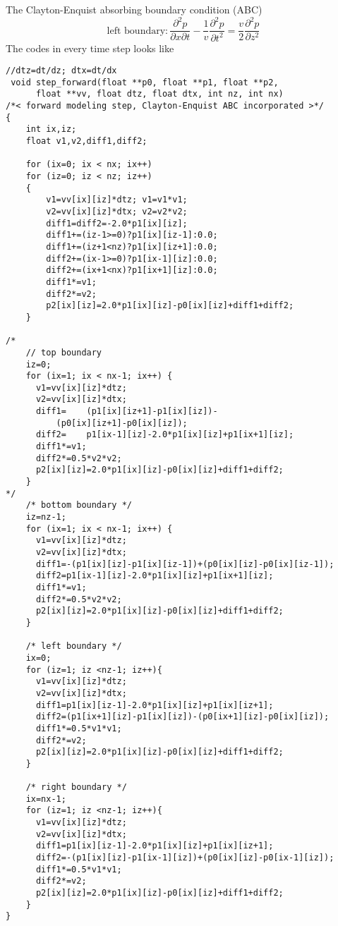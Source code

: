 The Clayton-Enquist absorbing boundary condition (ABC) \citep{Clayton_1977_ABC}
\begin{equation}
 \mbox{left boundary}:\frac{\partial^2 p}{\partial x\partial t}-\frac{1}{v}\frac{\partial^2 p}{\partial t^2}=\frac{v}{2}\frac{\partial^2 p}{\partial z^2}
\end{equation}
The codes in every time step looks like
\begin{lstlisting}
//dtz=dt/dz; dtx=dt/dx
 void step_forward(float **p0, float **p1, float **p2, 
      float **vv, float dtz, float dtx, int nz, int nx)
/*< forward modeling step, Clayton-Enquist ABC incorporated >*/
{
    int ix,iz;
    float v1,v2,diff1,diff2;

    for (ix=0; ix < nx; ix++) 
    for (iz=0; iz < nz; iz++) 
    {
	    v1=vv[ix][iz]*dtz; v1=v1*v1;
	    v2=vv[ix][iz]*dtx; v2=v2*v2;
	    diff1=diff2=-2.0*p1[ix][iz];
	    diff1+=(iz-1>=0)?p1[ix][iz-1]:0.0;
	    diff1+=(iz+1<nz)?p1[ix][iz+1]:0.0;
	    diff2+=(ix-1>=0)?p1[ix-1][iz]:0.0;
	    diff2+=(ix+1<nx)?p1[ix+1][iz]:0.0;
	    diff1*=v1;
	    diff2*=v2;
	    p2[ix][iz]=2.0*p1[ix][iz]-p0[ix][iz]+diff1+diff2;
    }

/*
    // top boundary 
    iz=0;
    for (ix=1; ix < nx-1; ix++) { 
	  v1=vv[ix][iz]*dtz; 
	  v2=vv[ix][iz]*dtx;
	  diff1=	(p1[ix][iz+1]-p1[ix][iz])-
		  (p0[ix][iz+1]-p0[ix][iz]);
	  diff2=	p1[ix-1][iz]-2.0*p1[ix][iz]+p1[ix+1][iz];
	  diff1*=v1;
	  diff2*=0.5*v2*v2;
	  p2[ix][iz]=2.0*p1[ix][iz]-p0[ix][iz]+diff1+diff2;
    }
*/
    /* bottom boundary */
    iz=nz-1;
    for (ix=1; ix < nx-1; ix++) { 
	  v1=vv[ix][iz]*dtz; 
	  v2=vv[ix][iz]*dtx;
	  diff1=-(p1[ix][iz]-p1[ix][iz-1])+(p0[ix][iz]-p0[ix][iz-1]);
	  diff2=p1[ix-1][iz]-2.0*p1[ix][iz]+p1[ix+1][iz];
	  diff1*=v1;
	  diff2*=0.5*v2*v2;
	  p2[ix][iz]=2.0*p1[ix][iz]-p0[ix][iz]+diff1+diff2;
    }

    /* left boundary */
    ix=0;
    for (iz=1; iz <nz-1; iz++){ 
	  v1=vv[ix][iz]*dtz; 
	  v2=vv[ix][iz]*dtx;
	  diff1=p1[ix][iz-1]-2.0*p1[ix][iz]+p1[ix][iz+1];
	  diff2=(p1[ix+1][iz]-p1[ix][iz])-(p0[ix+1][iz]-p0[ix][iz]);
	  diff1*=0.5*v1*v1;
	  diff2*=v2;
	  p2[ix][iz]=2.0*p1[ix][iz]-p0[ix][iz]+diff1+diff2;
    }

    /* right boundary */
    ix=nx-1;
    for (iz=1; iz <nz-1; iz++){ 
	  v1=vv[ix][iz]*dtz; 
	  v2=vv[ix][iz]*dtx;
	  diff1=p1[ix][iz-1]-2.0*p1[ix][iz]+p1[ix][iz+1];
	  diff2=-(p1[ix][iz]-p1[ix-1][iz])+(p0[ix][iz]-p0[ix-1][iz]);
	  diff1*=0.5*v1*v1;
	  diff2*=v2;
	  p2[ix][iz]=2.0*p1[ix][iz]-p0[ix][iz]+diff1+diff2;
    }  
}
\end{lstlisting}



